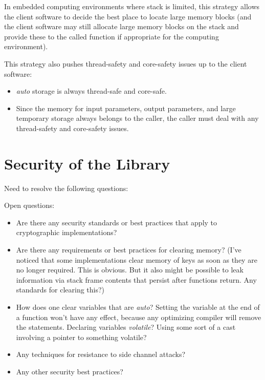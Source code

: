 In embedded computing environments where stack is limited, 
this strategy allows the client software to decide the best 
place to locate large memory blocks (and the client software 
may still allocate large memory blocks on the stack and 
provide these to the called \emph{\productbasenameshort{}} 
function if appropriate for the computing environment).  

This strategy also pushes thread-safety and core-safety 
issues up to the client software: 

\begin{itemize}
\item \emph{auto} storage is always thread-safe and
      core-safe.
\item Since the memory for input parameters, output
      parameters, and large temporary storage always
      belongs to the caller, the caller must deal
      with any thread-safety and core-safety issues.
\end{itemize}


\section{Security of the Library}
\label{cldd0:sstl0}

Need to resolve the following questions:

Open questions:

\begin{itemize}
\item Are there any security standards or best practices
      that apply to cryptographic implementations?
\item Are there any requirements or best practices for 
      clearing memory? (I've noticed
      that some implementations clear memory of
      keys as soon as they
      are no longer required.  This is obvious.
      But it also might be
      possible to leak information via stack frame
      contents that persist
      after functions return.  Any standards for
      clearing this?)
\item How does one clear variables that are \emph{auto}?
      Setting the variable at the end of a function won't 
      have any effect, because any optimizing compiler will 
      remove the statements.  Declaring variables 
      \emph{volatile}?  Using some sort of a cast involving 
      a pointer to something volatile?
\item Any techniques for resistance to side channel 
      attacks?
\item Any other security best practices?
\end{itemize}


